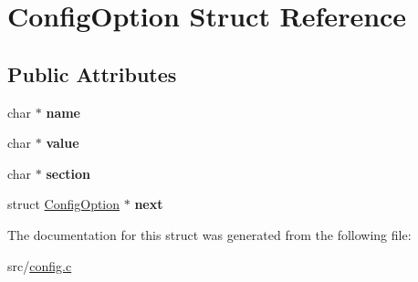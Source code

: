 \hypertarget{structConfigOption}{\section{\-Config\-Option \-Struct \-Reference}
\label{structConfigOption}
}
\subsection*{\-Public \-Attributes}
\begin{DoxyCompactItemize}
\item 
\hypertarget{structConfigOption_a8dc6a5e10d3f048a19843a787614d2a4}{char $\ast$ {\bfseries name}}\label{structConfigOption_a8dc6a5e10d3f048a19843a787614d2a4}

\item 
\hypertarget{structConfigOption_a7744464324b11814fb995fd01d69a595}{char $\ast$ {\bfseries value}}\label{structConfigOption_a7744464324b11814fb995fd01d69a595}

\item 
\hypertarget{structConfigOption_acca2c375d93b980a861538ceeed618b4}{char $\ast$ {\bfseries section}}\label{structConfigOption_acca2c375d93b980a861538ceeed618b4}

\item 
\hypertarget{structConfigOption_a15b925b102759c36be6462f899a7ae83}{struct \hyperlink{structConfigOption}{\-Config\-Option} $\ast$ {\bfseries next}}\label{structConfigOption_a15b925b102759c36be6462f899a7ae83}

\end{DoxyCompactItemize}


\-The documentation for this struct was generated from the following file\-:\begin{DoxyCompactItemize}
\item 
src/\hyperlink{config_8c}{config.\-c}\end{DoxyCompactItemize}
